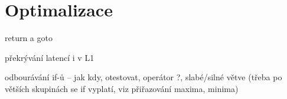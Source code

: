 
\section{Optimalizace}

return a goto

překrývání latencí i v L1

odbourávání if-ů -- jak kdy, otestovat, operátor ?,
slabé/silné větve (třeba po větších skupinách se if vyplatí, 
viz přiřazování maxima, minima)